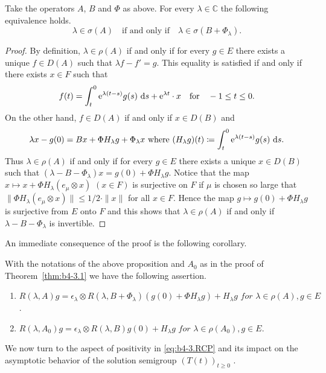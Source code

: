 \begin{proposition}\label{prop:b4-3.4}
%
%
	Take the operators $A$, $B$ and $\Phi$ as above. 
    For every $\lambda \in \mathbb{C}$ the following equivalence holds. 
	\begin{equation}\label{eq:b4-3.4}
		\lambda \in \sigma(A) \quad \text{if and only if} \quad \lambda \in \sigma(B + \Phi_\lambda).
	\end{equation}
\end{proposition}
\begin{proof} By definition, $\lambda \in \rho(A)$ if and only if for every $g \in E$ there exists a unique $f \in D(A)$ such that $\lambda f - f' = g$. 
This equality is satisfied if and only if there exists $x \in F$ such that
\[
f(t) = \int_t^0 \mathrm{e}^{\lambda(t-s)} g(s) \,\mathop{}\!\mathrm{d}{s} + \mathrm{e}^{\lambda t} \cdot x \quad \text{for} \quad -1 \leq t \leq 0   .
\]
On the other hand, $f \in D(A)$ if and only if $x \in D(B)$ and
\[
\text{$\lambda x - g(0) = Bx + \Phi H_\lambda g + \Phi_\lambda x$ where $(H_\lambda g)(t) \coloneq  \int_t^0 \mathrm{e}^{\lambda(t-s)} g(s) \,\mathop{}\!\mathrm{d}{s} .$}
\]
Thus $\lambda \in \rho(A)$ if and only if for every $g \in E$ there exists a unique $x \in D(B)$ such that $(\lambda - B - \Phi_\lambda)x = g(0) + \Phi H_\lambda g$. 
Notice that the map $x \mapsto x + \Phi H_\lambda(e_\mu \otimes x)$ $(x \in F)$ is surjective on $F$ if $\mu$ is chosen so large that $\|\Phi H_\lambda(e_\mu \otimes x)\| \leq 1/2 \cdot \|x\|$ for all $x \in F$. 
Hence the map $g \mapsto g(0) + \Phi H_\lambda g$ is surjective from $E$ onto $F$ and this shows that $\lambda \in \rho(A)$ if and only if $\lambda - B - \Phi_\lambda$ is invertible.
\end{proof}
An immediate consequence of the proof is the following corollary.

\begin{corollary*}
With the notations of the above proposition and $A_{0}$ as in the proof of Theorem~\ref{thm:b4-3.1} we have the following assertion.
\begin{enumerate}[\upshape (i)]
	\item  
	$R(\lambda,A)g = \epsilon_\lambda \otimes R(\lambda,B+\Phi_\lambda)(g(0)+\Phi H_\lambda g) + H_\lambda g \textit{ for } \lambda \in \rho(A), g \in E$.

	\item 
	$R(\lambda,A_{0})g = \epsilon_\lambda \otimes R(\lambda,B)g(0) + H_\lambda g \textit{ for }  \lambda \in \rho(A_{0}), g \in E$.
\end{enumerate}
\end{corollary*}
We now turn to the aspect of positivity in \eqref{eq:b4-3.RCP} and its impact on the asymptotic behavior of the solution semigroup $(T(t))_{t \geq 0}$ .

